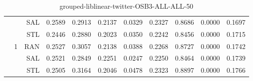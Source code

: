\begin{center}
\begin{table}[htbp]
\begin{center}
\begin{tabular}{ | r | r | r | r | r | r | r | r | r | r | r |}
 &   & SAL & 0.2589 & 0.2913 & 0.2137 & 0.0329 & 0.2327 & 0.8686 & 0.0000 & 0.1697\\ \cline{3-11}
 &   & STL & 0.2446 & 0.2880 & 0.2023 & 0.0350 & 0.2242 & 0.8456 & 0.0000 & 0.1715\\ \cline{2-11}
 & \multirow{3}{*}{1} & RAN & 0.2527 & 0.3057 & 0.2138 & 0.0388 & 0.2268 & 0.8727 & 0.0000 & 0.1742\\ \cline{3-11}
 &   & SAL & 0.2521 & 0.2849 & 0.2251 & 0.0247 & 0.2250 & 0.8464 & 0.0000 & 0.1739\\ \cline{3-11}
 &   & STL & 0.2505 & 0.3164 & 0.2046 & 0.0478 & 0.2323 & 0.8897 & 0.0000 & 0.1766\\ \cline{2-11}
\hline
\end{tabular}
\caption{grouped-liblinear-twitter-OSB3-ALL-ALL-50}
\end{center}
 \end{table}
\end{center}

